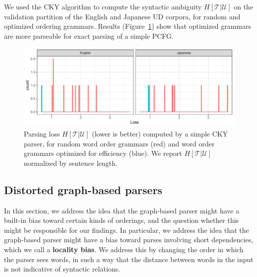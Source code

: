 \documentclass[10pt,twoside,lineno]{article}
\newcommand{\key}[1]{\textbf{#1}}
\newcommand{\utterance}{\mathcal{U}}
\newcommand{\tree}{\mathcal{T}}
\begin{document}
We used the CKY algorithm to compute the syntactic ambiguity $H[\tree|\utterance]$ on the validation partition of the English and Japanese UD corpora, for random and optimized ordering grammars.
Results (Figure~\ref{fig:cky-parser}) show that optimized grammars are more parseable for exact parsing of a simple PCFG.


\begin{figure}
    \centering
    \includegraphics[scale=.7]{../results/cky/cky-parse.pdf} 
	\caption{Parsing loss $H[\tree|\utterance]$ (lower is better) computed by a simple CKY parser, for random word order grammars (red) and word order grammars optimized for efficiency (blue). We report $H[\tree|\utterance]$ normalized by sentence length.}
    \label{fig:cky-parser}
\end{figure}



\subsection{Distorted graph-based parsers}

In this section, we address the idea that the graph-based parser might have a built-in bias toward certain kinds of orderings, and the question whether this might be responsible for our findings.
In particular, we address the idea that the graph-based parser might have a bias toward parses involving short dependencies, which we call a \key{locality bias}. 
We address this by changing the order in which the parser sees words, in such a way that the distance between words in the input is not indicative of syntactic relations.


\end{document}
